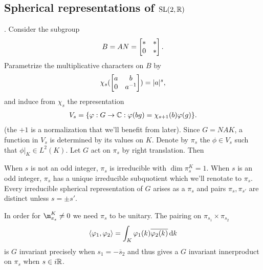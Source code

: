 \documentclass[11pt]{amsart}
\begin{document}
		\subsection{Spherical representations of $\operatorname{SL}(2,\mathbb{R})$}.
			 Consider the subgroup 
				 \begin{align*}
					B=AN=\left[ \begin{matrix} * & * \\ 0 & * \end{matrix} \right].
				\end{align*} 
		Parametrize the multiplicative characters on $B$ by
			\begin{align*}
				\chi_{s}(\left[ \begin{matrix} a & b \\ 0 & a^{-1} \end{matrix} \right])=|a|^{s},
			\end{align*}
			and induce from $\chi_{s}$ the representation
				\begin{align*}
					V_{s}=\{ \varphi:G\to \mathbb{C}: \varphi(bg)=\chi_{s+1}(b)\varphi(g)\}.
				\end{align*}
		(the $+1$ is a normalization that we'll benefit from later). Since $G=NAK$, a function in $V_{s}$ is determined by its values on $K$. Denote by $\pi_{s}$ the $\phi \in V_{s}$ such that $\phi|_{K} \in L^{2}(K)$. Let $G$ act on $\pi_{s}$ by right translation. Then
	\begin{thm}
	When $s$ is not an odd integer, $\pi_{s}$ is irreducible with $\dim \pi_{s}^{K}=1$.  When  $s$ is an odd integer, $\pi_{s}$ has a unique irreducible subquotient which we'll renotate to $\pi_{s}$. Every irreducible spherical representation of $G$ arises as a $\pi_{s}$ and pairs $\pi_{s},\pi_{s'}$ are distinct unless $s=\pm s'$. 
	\end{thm}
	In order for  $\m_{\pi_{s}}^{K}\neq0$ we need $\pi_{s}$ to be unitary. The pairing on $\pi_{s_{1}}\times \pi_{s_{2}}$ 
		\begin{align*}
			\langle \varphi_{1}, \varphi_{2} \rangle=\int_{K}\varphi_{1}(k)\overline{\varphi_{2}(k)}\,{\rm d} k
		\end{align*}
	is $G$ invariant precisely when $s_{1}=-\overline s_{2}$ and thus gives a $G$ invariant innerproduct on $\pi_{s}$ when $s\in i\mathbb{R}$.  \\
	
\end{document}
